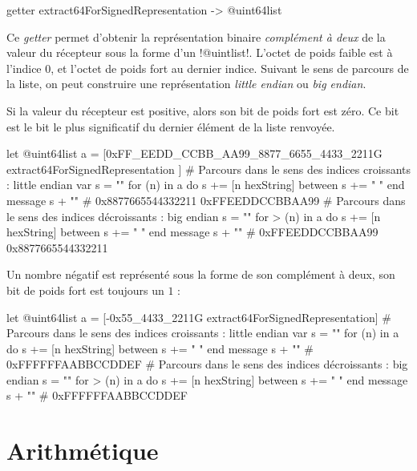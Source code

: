 
\begin{galgas3box}
getter extract64ForSignedRepresentation -> @uint64list
\end{galgas3box}

Ce \emph{getter} permet d'obtenir la représentation binaire \emph{complément à deux} de la valeur du récepteur sous la forme d'un \ggst!@uintlist!. L'octet de poids faible est à l'indice $0$, et l'octet de poids fort au dernier indice. Suivant le sens de parcours de la liste, on peut construire une représentation \emph{little endian} ou \emph{big endian}.

Si la valeur du récepteur est positive, alors son bit de poids fort est zéro. Ce bit est le bit le plus significatif du dernier élément de la liste renvoyée.

\begin{galgas3}
let @uint64list a = [0xFF_EEDD_CCBB_AA99_8877_6655_4433_2211G
  extract64ForSignedRepresentation
]
# Parcours dans le sens des indices croissants : little endian
var s = ""
for (n) in a
  do s += [n hexString]
  between s += " "
end
message s + "\n" # 0x8877665544332211 0xFFEEDDCCBBAA99
# Parcours dans le sens des indices décroissants : big endian
s = ""
for > (n) in a
  do s += [n hexString]
  between s += " "
end
message s + "\n" # 0xFFEEDDCCBBAA99 0x8877665544332211
\end{galgas3}

Un nombre négatif est représenté sous la forme de son complément à deux, son bit de poids fort est toujours un $1$ :

\begin{galgas3}
let @uint64list a = [-0x55_4433_2211G extract64ForSignedRepresentation]
# Parcours dans le sens des indices croissants : little endian
var s = ""
for (n) in a
  do s += [n hexString]
  between s += " "
end
message s + "\n" # 0xFFFFFFAABBCCDDEF
# Parcours dans le sens des indices décroissants : big endian
s = ""
for > (n) in a
  do s += [n hexString]
  between s += " "
end
message s + "\n" # 0xFFFFFFAABBCCDDEF
\end{galgas3}














\section{Arithmétique}



